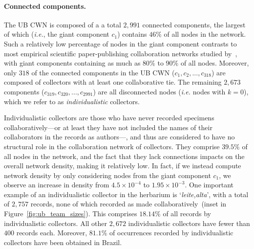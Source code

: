 \paragraph{Connected components.}
The UB CWN is composed of a a total $2,991$ connected components, the largest of which (\textit{i.e.}, the giant component $c_1$) contains $46\%$ of all nodes in the network.
Such a relatively low percentage of nodes in the giant component contrasts to most empirical scientific paper-publishing collaboration networks studied by~, with giant components containing as much as $80\%$ to $90\%$ of all nodes.
Moreover, only $318$ of the connected components in the UB CWN ($c_1, c_2, ..., c_{318}$) are composed of collectors with at least one collaborative tie.
The remaining $2,673$ components ($c_{319}, c_{320}, ..., c_{2991}$) are all disconnected nodes (\textit{i.e.} nodes with $k=0$), which we refer to as \textit{individualistic} collectors.

Individualistic collectors are those who have never recorded specimens collaboratively---or at least they have not included the names of their collaborators in the records as authors---, and thus are considered to have no structural role in the collaboration network of collectors.
They comprise $39.5\%$ of all nodes in the network, and the fact that they lack connections impacts on the overall network density, making it relatively low.
In fact, if we instead compute network density by only considering nodes from the giant component $c_1$, we observe an increase in density from $4.5 \times 10^{-4}$ to $1.95 \times 10^{-3}$. 
%
One important example of an individualistic collector in the herbarium is `\textit{leite,alta}', with a total of $2,757$ records, none of which recorded as made collaboratively~(inset in Figure~\ref{fig:ub_team_sizes}).  %
This comprises $18.14\%$ of all records by individualistic collectors.
All other $2,672$ individualistic collectors have fewer than $400$ records each.
Moreover, $81.1\%$ of occurrences recorded by individualistic collectors have been obtained in Brazil.



